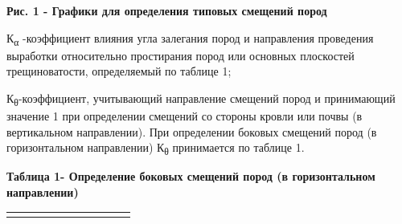 {\bfseries Рис. 1 - Графики для определения типовых смещений пород}

К\textsubscript{α} -коэффициент влияния угла залегания пород и
на­правления проведения выработки относительно простирания по­род или
основных плоскостей трещиноватости, определяемый по таблице 1;

К\textsubscript{θ}-коэффициент, учитывающий направление сме­щений пород и
принимающий значение 1 при определении сме­щений со стороны кровли или
почвы (в вертикальном направ­лении). При определении боковых смещений
пород (в горизон­тальном направлении) К\textsubscript{θ} принимается по
таблице 1.

{\bfseries Таблица 1- Определение боковых смещений пород (в горизонтальном
направлении)}

\begin{longtable}[]{@{}
  >{\raggedright\arraybackslash}p{}
  >{\raggedright\arraybackslash}p{}
  >{\raggedright\arraybackslash}p{}
  >{\raggedright\arraybackslash}p{}
  >{\raggedright\arraybackslash}p{}
  >{\raggedright\arraybackslash}p{}
  >{\raggedright\arraybackslash}p{}
  >{\raggedright\arraybackslash}p{}
  >{\raggedright\arraybackslash}p{}
  >{\raggedright\arraybackslash}p{}
  >{\raggedright\arraybackslash}p{}@{}}
\toprule\noalign{}
\endhead
\bottomrule\noalign{}
\endlastfoot
\multirow{3}{=}{Направление

проходки

}
\end{longtable}
